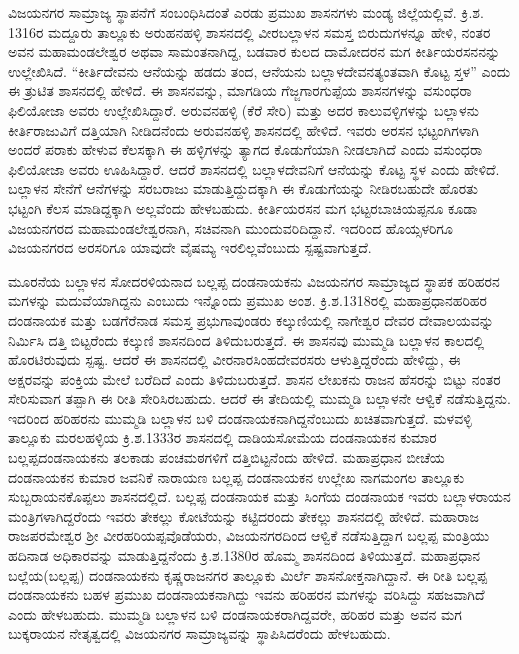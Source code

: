 ವಿಜಯನಗರ ಸಾಮ್ರಾಜ್ಯ ಸ್ಥಾಪನೆಗೆ ಸಂಬಂಧಿಸಿದಂತೆ ಎರಡು ಪ್ರಮುಖ ಶಾಸನಗಳು ಮಂಡ್ಯ ಜಿಲ್ಲೆಯಲ್ಲಿವೆ. ಕ್ರಿ.ಶ. 1316ರ ಮದ್ದೂರು ತಾಲ್ಲೂಕು ಅರುಹನಹಳ್ಳಿ ಶಾಸನದಲ್ಲಿ ವೀರಬಲ್ಲಾಳನ ಸಮಸ್ತ ಬಿರುದುಗಳನ್ನೂ ಹೇಳಿ, ನಂತರ ಅವನ ಮಹಾಮಂಡಲೇಶ್ವರ ಅಥವಾ ಸಾಮಂತನಾಗಿದ್ದ, ಬಡವಾರ ಕುಲದ ದಾಮೋದರನ ಮಗ ಕೀರ್ತಿಯರಸನನನ್ನು ಉಲ್ಲೇಖಿಸಿದೆ. “ಕೀರ್ತಿದೇವನು ಆನೆಯನ್ನು ಹಡದು ತಂದ, ಆನೆಯನು ಬಲ್ಲಾಳದೇವನತ್ಯಂತವಾಗಿ ಕೊಟ್ಟ ಸ್ತಳ” ಎಂದು ಈ ತ್ರುಟಿತ ಶಾಸನದಲ್ಲಿ ಹೇಳಿದೆ. ಈ ಶಾಸನವನ್ನು, ಮಾಗಡಿಯ ಗೆಜ್ಜಗಾರಗುಪ್ಪೆಯ ಶಾಸನಗಳನ್ನು ವಸುಂಧರಾ ಫಿಲಿಯೋಜಾ ಅವರು ಉಲ್ಲೇಖಿಸಿದ್ದಾರೆ. ಅರುವನಹಳ್ಳಿ (ಕೆರೆ ಸೇರಿ) ಮತ್ತು ಅದರ ಕಾಲುವಳ್ಳಿಗಳನ್ನು ಬಲ್ಲಾಳನು ಕೀರ್ತಿರಾಜುವಿಗೆ ದತ್ತಿಯಾಗಿ ನೀಡಿದನೆಂದು ಅರುವನಹಳ್ಳಿ ಶಾಸನದಲ್ಲಿ ಹೇಳಿದೆ. ಇವರು ಅರಸನ ಭಟ್ಟಂಗಿಗಳಾಗಿ ಅಂದರೆ ಪರಾಕು ಹೇಳುವ ಕೆಲಸಕ್ಕಾಗಿ ಈ ಹಳ್ಳಿಗಳನ್ನು ತ್ಯಾಗದ ಕೊಡುಗೆಯಾಗಿ ನೀಡಲಾಗಿದೆ ಎಂದು ವಸುಂಧರಾ ಫಿಲಿಯೋಜಾ ಅವರು ಊಹಿಸಿದ್ದಾರೆ. ಆದರೆ ಶಾಸನದಲ್ಲಿ ಬಲ್ಲಾಳದೇವನಿಗೆ ಆನೆಯನ್ನು ಕೊಟ್ಟ ಸ್ಥಳ ಎಂದು ಹೇಳಿದೆ. ಬಲ್ಲಾಳನ ಸೇನೆಗೆ ಆನೆಗಳನ್ನು ಸರಬರಾಜು ಮಾಡುತ್ತಿದ್ದುದಕ್ಕಾಗಿ ಈ ಕೊಡುಗೆಯನ್ನು ನೀಡಿರಬಹುದೇ ಹೊರತು ಭಟ್ಟಂಗಿ ಕೆಲಸ ಮಾಡಿದ್ದಕ್ಕಾಗಿ ಅಲ್ಲವೆಂದು ಹೇಳಬಹುದು. ಕೀರ್ತಿಯರಸನ ಮಗ ಭಟ್ಟರಬಾಚಿಯಪ್ಪನೂ ಕೂಡಾ ವಿಜಯನಗರದ ಮಹಾಮಂಡಲೇಶ್ವರನಾಗಿ, ಸಚಿವನಾಗಿ ಮುಂದುವರಿದಿದ್ದಾನೆ. ಇದರಿಂದ ಹೊಯ್ಸಳರಿಗೂ ವಿಜಯನಗರದ ಅರಸರಿಗೂ ಯಾವುದೇ ವೈಷಮ್ಯ ಇರಲಿಲ್ಲವೆಂಬುದು ಸ್ಪಷ್ಟವಾಗುತ್ತದೆ.

ಮೂರನೆಯ ಬಲ್ಲಾಳನ ಸೋದರಳಿಯನಾದ ಬಲ್ಲಪ್ಪ ದಂಡನಾಯಕನು ವಿಜಯನಗರ ಸಾಮ್ರಾಜ್ಯದ ಸ್ಥಾಪಕ ಹರಿಹರನ ಮಗಳನ್ನು ಮದುವೆಯಾಗಿದ್ದನು ಎಂಬುದು ಇನ್ನೊಂದು ಪ್ರಮುಖ ಅಂಶ. ಕ್ರಿ.ಶ.1318ರಲ್ಲಿ ಮಹಾಪ್ರಧಾನ\break ಹರಿಹರ ದಂಡನಾಯಕ ಮತ್ತು ಬಡಗೆರೆನಾಡ ಸಮಸ್ತ ಪ್ರಭುಗಾವುಂಡರು ಕಲ್ಕುಣಿಯಲ್ಲಿ ನಾಗೇಶ್ವರ ದೇವರ ದೇವಾಲಯವನ್ನು ನಿರ್ಮಿಸಿ ದತ್ತಿ ಬಿಟ್ಟರೆಂದು ಕಲ್ಕುಣಿ ಶಾಸನದಿಂದ ತಿಳಿದುಬರುತ್ತದೆ. ಈ ಶಾಸನವು ಮುಮ್ಮಡಿ ಬಲ್ಲಾಳನ ಕಾಲದಲ್ಲಿ ಹೊರಟಿರುವುದು ಸ್ಪಷ್ಟ. ಆದರೆ ಈ ಶಾಸನದಲ್ಲಿ ವೀರನಾರಸಿಂಹದೇವರಸರು ಆಳುತ್ತಿದ್ದರೆಂದು ಹೇಳಿದ್ದು, ಈ ಅಕ್ಷರವನ್ನು ಪಂಕ್ತಿಯ ಮೇಲೆ ಬರೆದಿದೆ ಎಂದು ತಿಳಿದುಬರುತ್ತದೆ. ಶಾಸನ ಲೇಖಕನು ರಾಜನ ಹೆಸರನ್ನು ಬಿಟ್ಟು ನಂತರ ಸೇರಿಸುವಾಗ ತಪ್ಪಾಗಿ ಈ ರೀತಿ ಸೇರಿಸಿರಬಹುದು. ಆದರೆ ಈ ತೇದಿಯಲ್ಲಿ ಮುಮ್ಮಡಿ ಬಲ್ಲಾಳನೇ ಆಳ್ವಿಕೆ ನಡೆಸುತ್ತಿದ್ದನು. ಇದರಿಂದ ಹರಿಹರನು ಮುಮ್ಮಡಿ ಬಲ್ಲಾಳನ ಬಳಿ ದಂಡನಾಯಕನಾಗಿದ್ದನೆಂಬುದು ಖಚಿತವಾಗುತ್ತದೆ. ಮಳವಳ್ಳಿ ತಾಲ್ಲೂಕು ಮರಲಹಳ್ಳಿಯ ಕ್ರಿ.ಶ.1333ರ ಶಾಸನದಲ್ಲಿ ದಾಡಿಯಸೋಮೆಯ ದಂಡನಾಯಕನ ಕುಮಾರ ಬಲ್ಲಪ್ಪದಂಡನಾಯಕನು ತಲಕಾಡು ಪಂಚಮಠ\-ಗಳಿಗೆ ದತ್ತಿಬಿಟ್ಟ\-ನೆಂದು ಹೇಳಿದೆ. ಮಹಾಪ್ರಧಾನ ಬೀಚೆಯ ದಂಡನಾಯಕನ ಕುಮಾರ ಜವನಿಕೆ ನಾರಾಯಣ ಬಲ್ಲಪ್ಪ ದಂಡನಾಯಕನ ಉಲ್ಲೇಖ ನಾಗಮಂಗಲ ತಾಲ್ಲೂಕು ಸುಬ್ಬರಾಯನಕೊಪ್ಪಲು ಶಾಸನದಲ್ಲಿದೆ. ಬಲ್ಲಪ್ಪ ದಂಡನಾಯಕ ಮತ್ತು ಸಿಂಗೆಯ ದಂಡನಾಯಕ ಇವರು ಬಲ್ಲಾಳರಾಯನ ಮಂತ್ರಿಗಳಾಗಿದ್ದರೆಂದು ಇವರು ತೇಕಲ್ಲು ಕೋಟೆಯನ್ನು ಕಟ್ಟಿದರಂದು ತೇಕಲ್ಲು ಶಾಸನದಲ್ಲಿ ಹೇಳಿದೆ. ಮಹಾರಾಜ ರಾಜಪರಮೇಶ್ವರ ಶ‍್ರೀ ವೀರಹರಿಯಪ್ಪವೊಡೆಯರು, ವಿಜಯನಗರದಿಂದ ಆಳ್ವಿಕೆ ನಡೆಸುತ್ತಿದ್ದಾಗ ಬಲ್ಲಪ್ಪ ಮಂತ್ರಿಯು ಹದಿನಾಡ ಅಧಿಕಾರವನ್ನು ಮಾಡುತ್ತಿದ್ದನೆಂದು ಕ್ರಿ.ಶ.1380ರ ಹೊಮ್ಮ ಶಾಸನದಿಂದ ತಿಳಿಯುತ್ತದೆ. ಮಹಾಪ್ರಧಾನ ಬಲ್ಲೆಯ(ಬಲ್ಲಪ್ಪ) ದಂಡನಾಯಕನು ಕೃಷ್ಣರಾಜನಗರ ತಾಲ್ಲೂಕು ಮಿರ್ಲೆ ಶಾಸನೋಕ್ತನಾಗಿ\-ದ್ದಾನೆ. ಈ ರೀತಿ ಬಲ್ಲಪ್ಪ ದಂಡನಾಯಕನು ಬಹಳ ಪ್ರಮುಖ ದಂಡನಾಯಕನಾಗಿದ್ದು ಇವನು ಹರಿಹರನ ಮಗಳನ್ನು ವರಿಸಿದ್ದು ಸಹಜವಾಗಿದೆ ಎಂದು ಹೇಳಬಹುದು. ಮುಮ್ಮಡಿ ಬಲ್ಲಾಳನ ಬಳಿ ದಂಡನಾಯಕರಾಗಿದ್ದವರೇ, ಹರಿಹರ ಮತ್ತು ಅವನ ಮಗ ಬುಕ್ಕರಾಯನ ನೇತೃತ್ವದಲ್ಲಿ ವಿಜಯನಗರ ಸಾಮ್ರಾಜ್ಯವನ್ನು ಸ್ಥಾಪಿಸಿದರೆಂದು ಹೇಳಬಹುದು.

